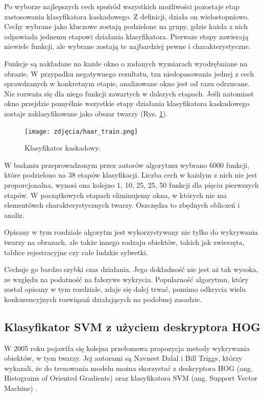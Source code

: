 Po wyborze najlepszych cech spośród wszystkich możliwości pozostaje etap zastosowania klasyfikatora kaskadowego. Z definicji, działa on wielostopniowo. Cechy wybrane jako kluczowe zostają podzielone na grupy, gdzie każda z nich odpowiada jednemu etapowi działania klasyfikatora. Pierwsze etapy zawierają niewiele funkcji, ale wybrane zostają te najbardziej pewne i charakterystyczne. 
 
Funkcje są nakładane na każde okno o zadanych wymiarach wyodrębniane na obrazie. W przypadku negatywnego rezultatu, tzn niedopasowania jednej z cech sprawdzanych w konkretnym etapie, analizowane okno jest od razu odrzucane. Nie rozważa się dla niego funkcji zawartych w dalszych etapach. Jeśli natomiast okno przejdzie pomyślnie wszystkie etapy działania klasyfikatora kaskadowego zostaje zaklasyfikowane jako obszar twarzy (Rys. \ref{fig:cascadeClasificator}).  
 
\begin{figure}[h]
	\centering
	\texttt{[image: zdjęcia/haar\_train.png]}
	\caption{Klasyfikator kaskadowy. \cite{haarCascade}} 
	\label{fig:cascadeClasificator}
\end{figure}

W badaniu przeprowadzonym przez autorów algorytmu wybrano 6000 funkcji, które podzielono na 38 etapów klasyfikacji. Liczba cech w każdym z nich nie jest proporcjonalna, wynosi ona kolejno 1, 10, 25, 25, 50 funkcji dla pięciu pierwszych etapów. W początkowych etapach eliminujemy okna, w których nie ma elementówch charakterystycznych twarzy. Oszczędza to zbędnych obliczeń i analiz.

Opisany w tym rozdziale algorytm jest wykorzystywany nie tylko do wykrywania twarzy na obrazach, ale także innego rodzaju obiektów, takich jak zwierzęta, tablice rejestracyjne czy całe ludzkie sylwetki. 

Cechuje go bardzo szybki czas działania. Jego dokładność nie jest aż tak wysoka, ze względu na podatność na fałszywe wykrycia.  Popularność algorytmu, który został opisany w tym rozdziale, zdaje się dalej trwać, pomimo odkrycia wielu konkurencyjnych rozwiązań działających na podobnej zasadzie. 

\subsection{Klasyfikator SVM z użyciem deskryptora HOG}
\label{sec:svmhog}
W 2005 roku pojawiła się kolejna przełomowa propozycja metody wykrywania obiektów, w tym twarzy. Jej autorami są Navneet Dalal i Bill Triggs, którzy wykazali, że do trenowania modelu można skorzystać z deskryptora HOG (ang. Histograms of Oriented Gradients) oraz klasyfikatora SVM (ang. Support Vector Machine) \cite{hog}. 


